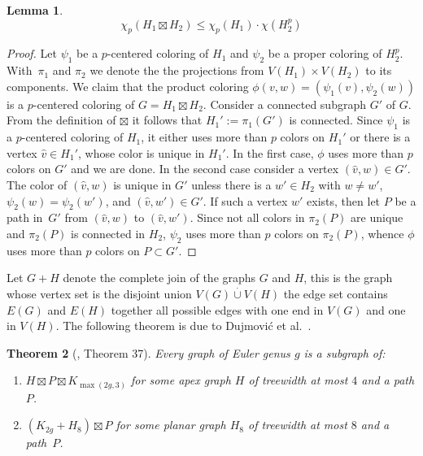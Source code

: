 \documentclass[11pt]{article}
\newtheorem{theorem}{Theorem}
\newtheorem{lemma}[theorem]{Lemma}
\begin{document}
\begin{lemma}
$$\chi_p(H_1\boxtimes H_2)\leq \chi_p(H_1)\cdot \chi(H_2^p) $$
\end{lemma}
\begin{proof}
  Let $\psi_1$ be a $p$-centered coloring of $H_1$ and $\psi_2$ be a proper
  coloring of $H_2^p$.  With~$\pi_1$ and $\pi_2$ we denote the the projections
  from $V(H_1)\times V(H_2)$ to its components.  We claim that the product
  coloring $\phi(v,w)=(\psi_1(v),\psi_2(w))$ is a $p$-centered coloring of
  $G=H_1 \boxtimes H_2$. Consider a connected subgraph $G'$ of $G$.  From the
  definition of $\boxtimes$ it follows that $H_1':=\pi_1(G')$ is
  connected. Since $\psi_1$ is a $p$-centered coloring of $H_1$, it either uses more
  than $p$ colors on $H_1'$ or there is a vertex $\hat{v}\in H_1'$, whose
  color is unique in $H_1'$. In the first case, $\phi$ uses more than $p$
  colors on $G'$ and we are done. In the second case consider a vertex
  $(\hat{v},w)\in G'$. The color of $(\hat{v},w)$ is unique in $G'$ unless
  there is a $w'\in H_2$ with $w\neq w'$, $\psi_2(w)=\psi_2(w')$, and $(\hat{v},w')\in G'$.
  If such a vertex $w'$ exists, then let $P$ be a path in~$G'$ from $(\hat{v},w)$ to
  $(\hat{v},w')$. Since not all colors in $\pi_2(P)$ are unique and $\pi_2(P)$ is connected in $H_2$, 
  $\psi_2$ uses more
  than $p$ colors on $\pi_2(P)$, whence $\phi$ uses more than $p$ colors on
  $P\subset G'$.
\end{proof}

Let $G+H$ denote the complete join of the graphs $G$ and $H$, this is the
graph whose vertex set is the disjoint union $V(G) \overset{\cdot}{\cup} V(H)$
the edge set contains $E(G)$ and $E(H)$ together all possible edges with one
end in $V(G)$ and one in $V(H)$.  The following theorem is due to
Dujmovi\'c et al.\ \cite{DJMMUW-queues}. 

\begin{theorem}[\cite{DJMMUW-queues}, Theorem 37]
\label{thm:genusGproduct}
Every graph of Euler genus $g$ is a subgraph of:
\begin{enumerate}
\item\label{gGp-first}
  $H\boxtimes P \boxtimes K_{\max(2g,3)}$ for some apex graph $H$ of
  treewidth at most $4$ and a path $P$.
\item\label{gGp-second}
  $(K_{2g}+H_8)\boxtimes P$ for some planar graph $H_8$ of treewidth at
  most $8$ and a path~$P$.
\end{enumerate}
\end{theorem}
\end{document}
